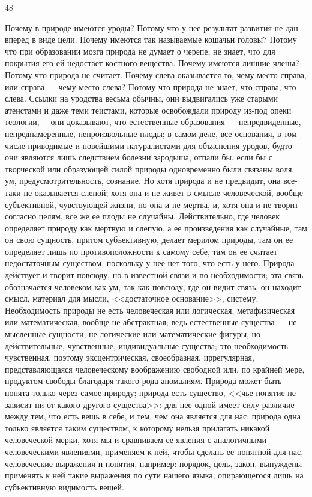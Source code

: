 \documentclass[12pt]{article}
\begin{document}
48

Почему в природе имеются уроды? Потому что у нее результат развития не дан вперед в виде цели. Почему имеются так называемые кошачьи головы? Потому что при образовании мозга природа не думает о черепе, не знает, что для покрытия его ей недостает костного вещества. Почему имеются лишние члены? Потому что природа не считает. Почему слева оказывается то, чему место справа, или справа --- чему место слева? Потому что природа не знает, что справа, что слева. Ссылки на уродства весьма обычны, они выдвигались уже старыми атеистами и даже теми теистами, которые освобождали природу из-под опеки теологии,--- они доказывают, что естественные образования --- непредвиденные, непреднамеренные, непроизвольные плоды; в самом деле, все основания, в том числе приводимые и новейшими натуралистами для объяснения уродов, будто они являются лишь следствием болезни зародыша, отпали бы, если бы с творческой или образующей силой природы одновременно были связаны воля, ум, предусмотрительность, сознание. Но хотя природа и не предвидит, она все-таки не оказывается слепой; хотя она и не живет в смысле человеческой, вообще субъективной, чувствующей жизни, но она и не мертва, и, хотя она и не творит согласно целям, все же ее плоды не случайны. Действительно, где человек определяет природу как мертвую и слепую, а ее произведения как случайные, там он свою сущность, притом субъективную, делает мерилом природы, там он ее определяет лишь по противоположности к самому себе, там он ее считает недостаточным существом, поскольку у нее нет того, что есть у него. Природа действует и творит повсюду, но в известной связи и по необходимости; эта связь обозначается человеком как ум, так как повсюду, где он видит связь, он находит смысл, материал для мысли, <<достаточное основание>>, систему. Необходимость природы не есть человеческая или логическая, метафизическая или математическая, вообще не абстрактная; ведь естественные существа --- не мысленные сущности, не логические или математические фигуры, но действительные, чувственные, индивидуальные существа; это необходимость чувственная, поэтому эксцентрическая, своеобразная, иррегулярная, представляющаяся человеческому воображению свободной или, по крайней мере, продуктом свободы благодаря такого рода аномалиям. Природа может быть понята только через самое природу; природа есть существо, <<чье понятие не зависит ни от какого другого существа>>: для нее одной имеет силу различие между тем, что есть вещь в себе, и тем, чем она является для нас; природа одна только является таким существом, к которому нельзя прилагать никакой человеческой мерки, хотя мы и сравниваем ее явления с аналогичными человеческими явлениями, применяем к ней, чтобы сделать ее понятной для нас, человеческие выражения и понятия, например: порядок, цель, закон, вынуждены применять к ней такие выражения по сути нашего языка, опирающегося лишь на субъективную видимость вещей.
\end{document}
